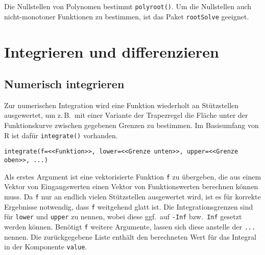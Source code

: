 Die Nullstellen von Polynomen bestimmt \lstinline!polyroot()!. Um die Nullstellen auch nicht-monotoner Funktionen zu bestimmen, ist das Paket \lstinline!rootSolve! \cite{Soetaert2009} geeignet.

\section{Integrieren und differenzieren}
\label{sec:intDiff}

\subsection{Numerisch integrieren}
\label{sec:integrate}

Zur numerischen Integration wird eine Funktion wiederholt an Stützstellen ausgewertet, um z.\,B.\ mit einer Variante der Trapezregel die Fläche unter der Funktionskurve zwischen gegebenen Grenzen zu bestimmen. Im Basisumfang von R ist dafür \lstinline!integrate()! vorhanden.
\begin{lstlisting}
integrate(f=<<Funktion>>, lower=<<Grenze unten>>, upper=<<Grenze oben>>, ...)
\end{lstlisting}

Als erstes Argument ist eine vektorisierte Funktion \lstinline!f! zu übergeben, die aus einem Vektor von Eingangswerten einen Vektor von Funktionswerten berechnen können muss. Da \lstinline!f! nur an endlich vielen Stützstellen ausgewertet wird, ist es für korrekte Ergebnisse notwendig, dass \lstinline!f! weitgehend glatt ist. Die Integrationsgrenzen sind für \lstinline!lower! und \lstinline!upper! zu nennen, wobei diese ggf.\ auf \lstinline!-Inf! bzw.\ \lstinline!Inf! gesetzt werden können. Benötigt \lstinline!f! weitere Argumente, lassen sich diese anstelle der \lstinline!...! nennen. Die zurückgegebene Liste enthält den berechneten Wert für das Integral in der Komponente \lstinline!value!.


